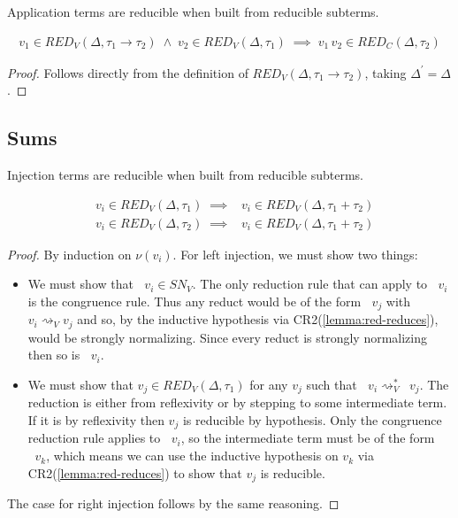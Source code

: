 \documentclass[acmsmall, screen, review, anonymous]{acmart}
\theoremstyle{definition}
\newcommand{\arr}{\rightarrow}
\newcommand{\inlname}{\mathop{\mathtt{in}_L}}
\newcommand{\inl}[1]{\inlname #1}
\newcommand{\inrname}{\mathop{\mathtt{in}_R}}
\newcommand{\inr}[1]{\inrname #1}
\newcommand{\app}[2]{#1\,#2}
\newcommand{\stepstoname}{\rightsquigarrow}
\newcommand{\stepstov}{\stepstoname_V}
\newcommand{\reducestoname}{\stepstoname^{*}}
\newcommand{\reducestov}{\reducestoname_{V}}
\newcommand{\snv}{SN_V}
\newcommand{\bound}[1]{\nu(#1)}
\newcommand{\redname}{RED}
\newcommand{\redvname}{\redname_{V}}
\newcommand{\redv}[2]{\redvname{({#1},{#2})}}
\newcommand{\redcname}{\redname_{C}}
\newcommand{\redc}[2]{\redcname{({#1},{#2})}}
\begin{document}
Application terms are reducible when built from reducible subterms.
\begin{lemma}
\label{lemma:red-app}
\begin{align*}
  v_1 \in \redv{\Delta}{\tau_1 \arr \tau_2} \; \wedge \; v_2 \in \redv{\Delta}{\tau_1}
  \; \implies \; \app{v_1}{v_2} \in \redc{\Delta}{\tau_2}
\end{align*}
\end{lemma}
\begin{proof}
  Follows directly from the definition of
  $\redv{\Delta}{\tau_1 \arr \tau_2}$, taking $\Delta^{\prime} = \Delta$.
\end{proof}

\subsection{Sums}

Injection terms are reducible when built from reducible subterms.
\begin{lemma}
\label{lemma:red-inj}
\begin{align*}
  &v_i \in \redv{\Delta}{\tau_1} \; \implies \; \inl{v_i} \in \redv{\Delta}{\tau_1 + \tau_2} \\
  &v_i \in \redv{\Delta}{\tau_2} \; \implies \; \inr{v_i} \in \redv{\Delta}{\tau_1 + \tau_2}
\end{align*}
\end{lemma}
\begin{proof}
  By induction on $\bound{v_i}$. For left injection, we must show two
  things:
  \begin{itemize}
  \item We must show that $\inl{v_i} \in \snv$. The only reduction rule that can apply
    to $\inl{v_i}$ is the congruence rule. Thus any reduct would be of
    the form $\inl{v_j}$ with $v_i \stepstov v_j$ and so, by the
    inductive hypothesis via CR2(\ref{lemma:red-reduces}), would be
    strongly normalizing. Since every reduct is strongly normalizing then
    so is $\inl{v_i}$.
  \item We must show that $v_j \in \redv{\Delta}{\tau_1}$ for any $v_j$ such that $\inl{v_i} \reducestov \inl{v_j}$.
    The reduction is either from reflexivity or by stepping to some intermediate term. If
    it is by reflexivity then $v_j$ is reducible by hypothesis. Only the
    congruence reduction rule applies to $\inl{v_i}$, so the intermediate
    term must be of the form $\inl{v_k}$, which means we can use the
    inductive hypothesis on $v_k$ via CR2(\ref{lemma:red-reduces}) to show
    that $v_j$ is reducible.
  \end{itemize}

  The case for right injection follows by the same reasoning.
\end{proof}
\end{document}
